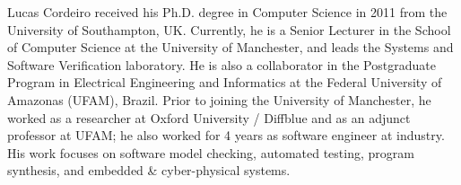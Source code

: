 \documentclass[journal]{IEEEtran}
\begin{document}
%
%
\begin{IEEEbiography}
    {Lucas Cordeiro}
received his Ph.D. degree in Computer Science in 2011 from the University of Southampton, UK. Currently, he is a Senior Lecturer in the School of Computer Science at the University of Manchester, and leads the Systems and Software Verification laboratory. He is also a collaborator in the Postgraduate Program in Electrical Engineering and Informatics at the Federal University of Amazonas (UFAM), Brazil. Prior to joining the University of Manchester, he worked as a researcher at Oxford University / Diffblue and as an adjunct professor at UFAM; he also worked for 4 years as software engineer at industry. His work focuses on software model checking, automated testing, program synthesis, and embedded \& cyber-physical systems.
\end{IEEEbiography}





\end{document}
